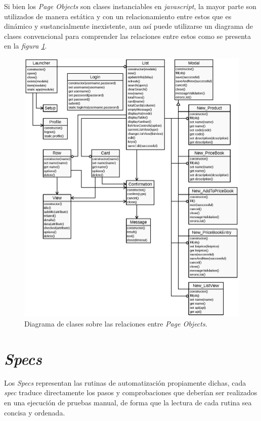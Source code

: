 Si bien los \emph{Page Objects} son clases instanciables en \emph{javascript},
la mayor parte son utilizados de manera estática y con un relacionamiento
entre estos que es dinámico y sustancialmente inexistente, aun así puede
utilizarse un diagrama de clases convencional para comprender las relaciones
entre estos como se presenta en la \emph{figura \ref{pom}}.

\begin{figure}
\centering
\includegraphics[width=1.0\textwidth]{graphics/diagram01.eps}
\caption{Diagrama de clases sobre las relaciones entre \emph{Page Objects}.}
\label{pom}
\end{figure}

\section{\emph{Specs}}
Los \emph{Specs} representan las rutinas de automatización propiamente dichas,
cada \emph{spec} traduce directamente los pasos y comprobaciones que deberían
ser realizados en una ejecución de pruebas manual, de forma que la lectura de
cada rutina sea concisa y ordenada.

